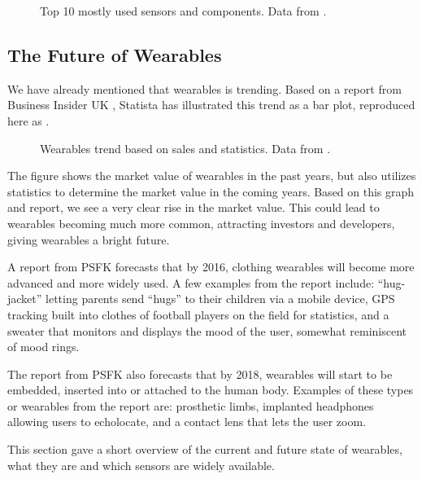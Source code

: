 \begin{figure}[!htb]
    \centering
    
    \caption{Top 10 mostly used sensors and components. Data from \protect\cite{LISTOFWEARABLES}.}
    \label{fig:wearables-sensors}
\end{figure}

\subsection{The Future of Wearables}
We have already mentioned that wearables is trending. 
Based on a report from Business Insider UK \cite{WEARABLESTREND}, 
Statista \cite{WEARABLESTRENDNUMBERS} has illustrated this trend as a bar plot, 
reproduced here as .

\begin{figure}[!htb]
  \centering
  
  \caption{Wearables trend based on sales and statistics. Data from \protect\cite{WEARABLESTRENDNUMBERS}.}
  \label{fig:wearables-trend}
\end{figure}

The figure shows the market value of wearables in the past years, 
but also utilizes statistics to determine the market value in the coming years. 
Based on this graph and report, 
we see a very clear rise in the market value. 
This could lead to wearables becoming much more common,
attracting investors and developers, 
giving wearables a bright future. 

A report from PSFK \cite{PSFK} forecasts that by 2016, 
clothing wearables will become more advanced and more widely used. 
A few examples from the report include: 
``hug-jacket'' letting parents send ``hugs'' to their children via a mobile device, 
GPS tracking built into clothes of football players on the field for statistics, 
and a sweater that monitors and displays the mood of the user, somewhat reminiscent of mood rings.

The report from PSFK also forecasts that by 2018, 
wearables will start to be embedded, \ie inserted into or attached to the human body. 
Examples of these types or wearables from the report are: 
prosthetic limbs, implanted headphones allowing users to echolocate, 
and a contact lens that lets the user zoom.

This section gave a short overview of the current and future state of wearables, 
what they are and which sensors are widely available. 

